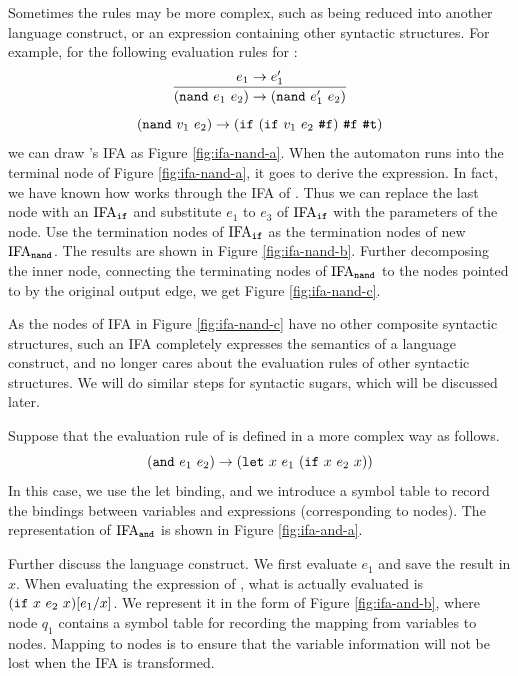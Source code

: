 \begin{example}
    Sometimes the rules may be more complex, such as being reduced into another language construct, or an expression containing other syntactic structures. For example, for the following evaluation rules for :
    \[
        \infer{(\m{nand}~e_1~e_2) \to (\m{nand}~e_1'~e_2)}{e_1 \to e_1'}
    \]\[
        (\mbox{\tt nand}~v_1~e_2) \to (\mbox{\tt if}~(\mbox{\tt if}~v_1~e_2~\mbox{\tt \#f})~\mbox{\tt \#f}~\mbox{\tt \#t})
    \]
    we can draw 's IFA as Figure \ref{fig:ifa-nand-a}.
    When the automaton runs into the terminal node of Figure \ref{fig:ifa-nand-a}, it goes to derive the  expression. In fact, we have known how  works through the IFA of . Thus we can replace the last node with an $\text{IFA}_{\mbox{\tt \scriptsize if}}$ and substitute $e_1$ to $e_3$ of $\text{IFA}_{\mbox{\tt \scriptsize if}}$ with the parameters of the node. Use the termination nodes of $\text{IFA}_{\mbox{\tt \scriptsize if}}$ as the termination nodes of new $\text{IFA}_{\mbox{\tt \scriptsize \scriptsize nand}}$. The results are shown in Figure \ref{fig:ifa-nand-b}. Further decomposing the inner  node, connecting the terminating nodes of $\text{IFA}_{\mbox{\tt \scriptsize nand}}$ to the nodes pointed to by the original output edge, we get Figure \ref{fig:ifa-nand-c}.

    As the nodes of IFA in Figure \ref{fig:ifa-nand-c} have no other composite syntactic structures, such an IFA completely expresses the semantics of a language construct, and no longer cares about the evaluation rules of other syntactic structures. We will do similar steps for syntactic sugars, which will be discussed later.
    \myend
\end{example}

\begin{example}

    Suppose that the evaluation rule of  is defined in a more complex way as follows.
    \[
        (\mbox{\tt and}~e_1~e_2) \to (\mbox{\tt let}~x~e_1~(\mbox{\tt if}~x~e_2~x))
    \]
    In this case, we use the let binding, and we introduce a symbol table to record the bindings between variables and expressions (corresponding to nodes). The representation of $\text{IFA}_{\mbox{\tt \scriptsize and}}$ is shown in Figure \ref{fig:ifa-and-a}.

    Further discuss the language construct. We first evaluate $e_1$ and save the result in $x$. When evaluating the expression of , what is actually evaluated is $(\mbox{\tt if}~x~e_2~x)[e_1/x]$. We represent it in the form of Figure \ref{fig:ifa-and-b}, where node $q_1$ contains a symbol table for recording the mapping from variables to nodes.
    Mapping to nodes is to ensure that the variable information will not be lost when the IFA is transformed.
    \myend
\end{example}


